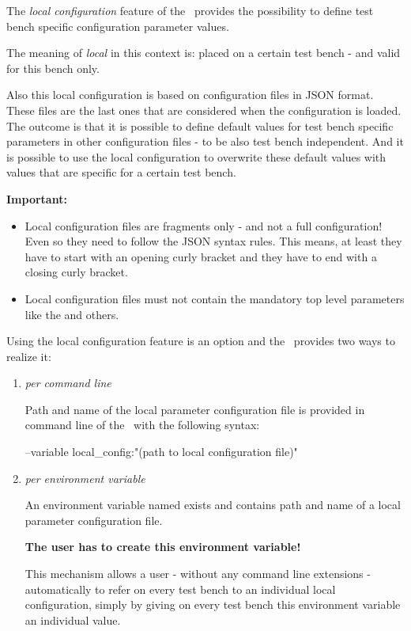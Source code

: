 The \textit{local configuration} feature of the \pkg\ provides the possibility to define test bench specific configuration parameter values.

The meaning of \textit{local} in this context is: placed on a certain test bench - and valid for this bench only.

Also this local configuration is based on configuration files in JSON format. These files are the last ones that are considered when the configuration is loaded.
The outcome is that it is possible to define default values for test bench specific parameters in other configuration files - to be also test bench independent.
And it is possible to use the local configuration to overwrite these default values with values that are specific for a certain test bench.

\textbf{Important:}

\begin{itemize}
   \item Local configuration files are fragments only - and not a full configuration! Even so they need to follow the JSON syntax rules.
         This means, at least they have to start with an opening curly bracket and they have to end with a closing curly bracket.
   \item Local configuration files must not contain the mandatory top level parameters like the  and others.
\end{itemize}

Using the local configuration feature is an option and the \pkg\ provides two ways to realize it:

\begin{enumerate}
   \item \textit{per command line}

         Path and name of the local parameter configuration file is provided in command line of the \rfwcore\ with the following syntax:
\begin{robotlog}
--variable local_config:"(path to local configuration file)"
\end{robotlog}

   \item \textit{per environment variable}

         An environment variable named  exists and contains path and name of a local parameter configuration file.

         \textbf{The user has to create this environment variable!}

         This mechanism allows a user - without any command line extensions - automatically to refer on every test bench to an individual local configuration,
         simply by giving on every test bench this environment variable an individual value.

\end{enumerate}

